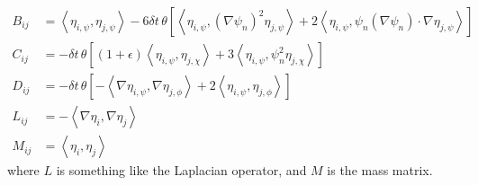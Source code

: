 \documentclass[reqno]{article}
\begin{document}
\begin{equation}
    \begin{split}
        B_{ij} 
        &= \left<\eta_{i,\psi}, \eta_{j, \psi}\right> 
        - 6 \delta t \, \theta \left[ \left< \eta_{i, \psi}, \left(\nabla \psi_n\right)^2 \eta_{j, \psi} \right>
        + 2 \left< \eta_{i, \psi}, \psi_n \left(\nabla \psi_n \right) \cdot \nabla \eta_{j, \psi} \right> \right] \\
        C_{ij}
        &= -\delta t \, \theta \left[ \left(1 + \epsilon\right) \left<\eta_{i, \psi}, \eta_{j, \chi}\right>
        + 3 \left< \eta_{i, \psi}, \psi_n^2 \eta_{j, \chi} \right>
        \right] \\
        D_{ij}
        &= -\delta t \, \theta \left[ -\left<\nabla \eta_{i, \psi}, \nabla \eta_{j, \phi}\right>
        + 2 \left< \eta_{i, \psi}, \eta_{j, \phi} \right> 
        \right] \\
        L_{ij}
        &= -\left< \nabla \eta_{i}, \nabla \eta_{j} \right> \\
        M_{ij}
        &= \left< \eta_i, \eta_j \right>
    \end{split}
\end{equation}
where $L$ is something like the Laplacian operator, and $M$ is the mass matrix.
\end{document}
